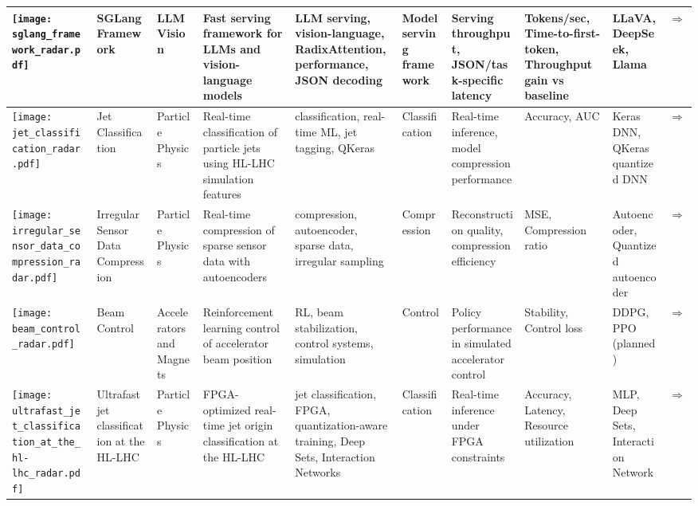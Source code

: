 \begin{landscape}
{\begin{longtable}{|p{}|p{}|p{}|p{}|p{}|p{}|p{}|p{}|p{}|p{}|}
\texttt{[image: sglang\_framework\_radar.pdf]} & SGLang Framework & LLM Vision & Fast serving framework for LLMs and vision-language models & LLM serving, vision-language, RadixAttention, performance, JSON decoding & Model serving framework & Serving throughput, JSON/task-specific latency & Tokens/sec, Time-to-first-token, Throughput gain vs baseline & LLaVA, DeepSeek, Llama & \cite{zheng2024sglangefficientexecutionstructured}\href{https://github.com/sgl-project/sglang/tree/main/benchmark}{$\Rightarrow$} \\ \hline
\texttt{[image: jet\_classification\_radar.pdf]} & Jet Classification & Particle Physics & Real-time classification of particle jets using HL-LHC simulation features & classification, real-time ML, jet tagging, QKeras & Classification & Real-time inference, model compression performance & Accuracy, AUC & Keras DNN, QKeras quantized DNN & \cite{duarte2022fastml}\href{https://github.com/fastmachinelearning/fastml-science/tree/main/jet-classify}{$\Rightarrow$} \\ \hline
\texttt{[image: irregular\_sensor\_data\_compression\_radar.pdf]} & Irregular Sensor Data Compression & Particle Physics & Real-time compression of sparse sensor data with autoencoders & compression, autoencoder, sparse data, irregular sampling & Compression & Reconstruction quality, compression efficiency & MSE, Compression ratio & Autoencoder, Quantized autoencoder & \cite{duarte2022fastmlsciencebenchmarksaccelerating2}\href{https://github.com/fastmachinelearning/fastml-science/tree/main/sensor-data-compression}{$\Rightarrow$} \\ \hline
\texttt{[image: beam\_control\_radar.pdf]} & Beam Control & Accelerators and Magnets & Reinforcement learning control of accelerator beam position & RL, beam stabilization, control systems, simulation & Control & Policy performance in simulated accelerator control & Stability, Control loss & DDPG, PPO (planned) & \cite{duarte2022fastmlsciencebenchmarksaccelerating3,kafkes2021boostrdatasetacceleratorcontrol}\href{https://github.com/fastmachinelearning/fastml-science/tree/main/beam-control}{$\Rightarrow$} \\ \hline
\texttt{[image: ultrafast\_jet\_classification\_at\_the\_hl-lhc\_radar.pdf]} & Ultrafast jet classification at the HL-LHC & Particle Physics & FPGA-optimized real-time jet origin classification at the HL-LHC & jet classification, FPGA, quantization-aware training, Deep Sets, Interaction Networks & Classification & Real-time inference under FPGA constraints & Accuracy, Latency, Resource utilization & MLP, Deep Sets, Interaction Network & \cite{odagiu2024ultrafastjetclassificationfpgas}\href{https://arxiv.org/pdf/2402.01876}{$\Rightarrow$} \\ \hline

\end{longtable}}
\end{landscape}
